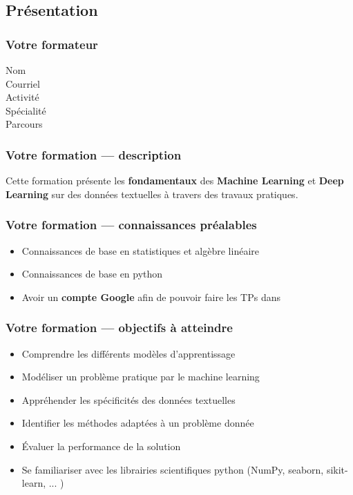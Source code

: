 \subsection{Présentation}

\begin{frame}
  \frametitle{Votre formateur}
  \begin{description}
  \item[Nom] \TrainerName
  \item[Courriel] \TrainerEmail
  \item[Activité] \TrainerActivity
  \item[Spécialité] \TrainerSpecialization
  \item[Parcours] \TrainerTraining
  \end{description}
\end{frame}

\begin{frame}
  \frametitle{Votre formation — description}
  Cette formation présente les \textbf{fondamentaux} des \textbf{Machine Learning} et  \textbf{Deep Learning} sur des données textuelles à travers des travaux pratiques. \\
\end{frame}

\begin{frame}
  \frametitle{Votre formation — connaissances préalables}
  \begin{itemize}
  \item Connaissances de base en statistiques et algèbre linéaire
  \item Connaissances de base en python
  \item Avoir un \textbf{compte Google} afin de pouvoir faire les TPs dans 
  \end{itemize}
\end{frame}

\begin{frame}
  \frametitle{Votre formation — objectifs à atteindre}
  \begin{itemize}
  \item Comprendre les différents modèles d'apprentissage
  \item Modéliser un problème pratique par le machine learning
  \item Appréhender les spécificités des données textuelles
  \item Identifier les méthodes adaptées à un problème donnée
  \item Évaluer la performance de la solution
  \item Se familiariser avec les librairies scientifiques python (NumPy, seaborn, sikit-learn, ... )
  \end{itemize}
\end{frame}

